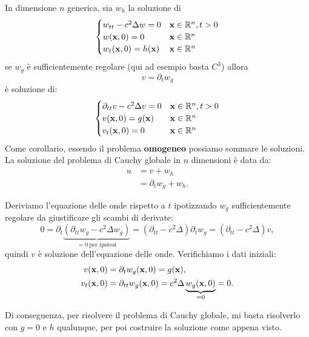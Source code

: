 \begin{theorem}
    [Lemma A] In dimensione $n$ generica, sia $w_{h}$ la soluzione di
    \begin{equation*}
        \begin{cases}
            w_{tt} -c^{2} \Delta w=0 & \mathbf{x} \in \mathbb{R}^{n} ,t >0 \\
            w(\mathbf{x} ,0) =0               & \mathbf{x} \in \mathbb{R}^{n}       \\
            w_{t}(\mathbf{x} ,0) =h(\mathbf{x})       & \mathbf{x} \in \mathbb{R}^{n}
        \end{cases}
    \end{equation*}
    se $w_{g}$ è sufficientemente regolare (qui ad esempio basta $C^{3}$) allora
    \begin{equation*}
        v=\partial _{t} w_{g}
    \end{equation*}
    è soluzione di:
    \begin{equation*}
        \begin{cases}
            \partial _{tt} v-c^{2} \Delta v=0 & \mathbf{x} \in \mathbb{R}^{n} ,t >0 \\
            v(\mathbf{x} ,0) =g(\mathbf{x})                   & \mathbf{x} \in \mathbb{R}^{n}       \\
            v_{t}(\mathbf{x} ,0) =0                   & \mathbf{x} \in \mathbb{R}^{n}
        \end{cases}
    \end{equation*}
    Come corollario, essendo il problema \textbf{omogeneo} possiamo sommare le soluzioni. La soluzione del problema di Cauchy globale in $n$ dimensioni è data da:
    \begin{align*}
        u & =v+w_{h}                     \\
          & =\partial _{t} w_{g} +w_{h}.
    \end{align*}
    \label{thm:lemma-A}
\end{theorem}
\begin{dimostrazione}
    Deriviamo l'equazione delle onde rispetto a $t$ ipotizzando $\displaystyle w_{g}$ sufficientemente regolare da giustificare gli scambi di derivate:
    \begin{equation*}
        0=\partial _{t}\underbrace{\left(\partial _{tt} w_{g} -c^{2} \Delta w_{g}\right)}_{=0\ \text{per ipotesi}} =\left(\partial _{tt} -c^{2} \Delta \right) \partial _{t} w_{g} =\left(\partial _{tt} -c^{2} \Delta \right) v,
    \end{equation*}
    quindi $v$ è soluzione dell'equazione delle onde. Verifichiamo i dati iniziali:
    \begin{align*}
        v(\mathbf{x} ,0)     & =\partial _{t} w_{g}(\mathbf{x} ,0) =g(\mathbf{x}) ,                                          \\
        v_{t}(\mathbf{x} ,0) & =\partial _{tt} w_{g}(\mathbf{x} ,0) =c^{2} \Delta \underbrace{w_{g}(\mathbf{x} ,0)}_{=0} =0.
    \end{align*}
\end{dimostrazione}
Di conseguenza, per risolvere il problema di Cauchy globale, mi basta risolverlo con $g=0$ e $h$ qualunque, per poi costruire la soluzione come appena visto.
